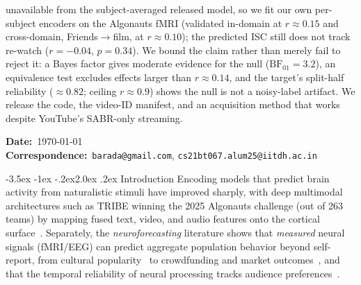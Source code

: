 \documentclass[11pt]{article}
\makeatletter
\renewcommand\section{\@startsection{section}{1}{\z@}%
  {-3.5ex \@plus -1ex \@minus -.2ex}{2.0ex \@plus.2ex}%
  {\normalfont\large\sffamily\bfseries}}
\makeatother
\begin{document}
{unavailable from the subject-averaged released model, so we fit our own per-subject encoders on
the Algonauts fMRI (validated in-domain at $r\approx0.15$ and cross-domain, Friends$\to$film, at
$r\approx0.10$); the predicted ISC still does not track re-watch ($r=-0.04$, $p=0.34$). We
bound the claim rather than merely fail to reject it: a Bayes
factor gives moderate evidence for the null ($\mathrm{BF}_{01}=3.2$), an equivalence test excludes
effects larger than $r\approx0.14$, and the target's split-half reliability ($\approx0.82$; ceiling
$r\approx0.9$) shows the null is not a noisy-label artifact. We release the code, the video-ID
manifest, and an acquisition method that works despite YouTube's SABR-only streaming.

\vspace{4pt}
\textbf{Date:}~\today \\
\textbf{Correspondence:}~\texttt{barada@gmail.com}, \texttt{cs21bt067.alum25@iitdh.ac.in}
}

\vspace{6pt}

\section{Introduction}
Encoding models that predict brain activity from naturalistic stimuli have improved sharply, with
deep multimodal architectures such as TRIBE winning the 2025 Algonauts challenge (out of 263 teams)
by mapping fused text, video, and audio features onto the cortical surface~\citep{dascoli2025tribe}.
Separately, the \emph{neuroforecasting} literature shows that \emph{measured} neural signals
(fMRI/EEG) can predict aggregate population behavior beyond self-report, from cultural
popularity~\citep{berns2012neural} to crowdfunding and market outcomes~\citep{genevsky2017brain},
and that the temporal reliability of neural processing tracks audience
preferences~\citep{dmochowski2014audience,hasson2004intersubject}.
\end{document}
